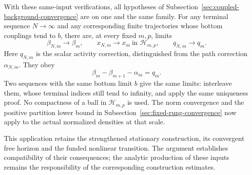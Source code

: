 With these same-input verifications, all hypotheses of
Subsection~\ref{sec:coupled-background-convergence} are on one and the
same family. For any terminal sequence
$N\to\infty$ and any corresponding finite trajectories whose bottom
couplings tend to $b$, there are, at every fixed $m,p$, limits
\[
 \beta_{N,m}\longrightarrow\beta_m,\qquad
 x_{N,m}\longrightarrow x_m\ \text{in }\mathcal H_{m,p},\qquad
 q_{N,m}\longrightarrow q_m.
\]
Here $q_{N,m}$ is the scalar activity correction, distinguished from
the path correction $\alpha_{N,m}$. They obey
\[
                \beta_m-\beta_{m+1}-\alpha_m=q_m.
\]
Two sequences with the same bottom limit $b$ give the same limits:
interleave them, whose terminal indices still tend to infinity,
and apply the same uniqueness proof. No compactness of a ball in
$\mathcal H_{m,p}$ is used. The norm convergence and the positive
partition lower bound in Subsection~\ref{sec:fixed-rung-convergence}
now apply to the actual normalized densities at that scale.

This application retains the strengthened stationary construction,
its convergent free horizon and the funded nonlinear transition.
The argument establishes compatibility of their consequences; the
analytic production of these inputs remains the responsibility of
the corresponding construction estimates.
